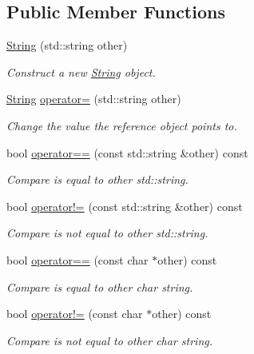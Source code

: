 \subsection*{Public Member Functions}
\begin{DoxyCompactItemize}
\item 
\hyperlink{classtvm_1_1runtime_1_1String_a02fca36e3ff55cc1e83635b02a11fca3}{String} (std\+::string other)
\begin{DoxyCompactList}\small\item\em Construct a new \hyperlink{classtvm_1_1runtime_1_1String}{String} object. \end{DoxyCompactList}\item 
\hyperlink{classtvm_1_1runtime_1_1String}{String} \hyperlink{classtvm_1_1runtime_1_1String_a0d6160f9a7e4efbafa7f6d7a42fec0d4}{operator=} (std\+::string other)
\begin{DoxyCompactList}\small\item\em Change the value the reference object points to. \end{DoxyCompactList}\item 
bool \hyperlink{classtvm_1_1runtime_1_1String_ae0c8008f2660354514aa1f59540ea0a1}{operator==} (const std\+::string \&other) const 
\begin{DoxyCompactList}\small\item\em Compare is equal to other std\+::string. \end{DoxyCompactList}\item 
bool \hyperlink{classtvm_1_1runtime_1_1String_ad6094750f4d337c7e5a1b04180675b41}{operator!=} (const std\+::string \&other) const 
\begin{DoxyCompactList}\small\item\em Compare is not equal to other std\+::string. \end{DoxyCompactList}\item 
bool \hyperlink{classtvm_1_1runtime_1_1String_a21ee70af849336830d9f7d01005dc0a3}{operator==} (const char $\ast$other) const 
\begin{DoxyCompactList}\small\item\em Compare is equal to other char string. \end{DoxyCompactList}\item 
bool \hyperlink{classtvm_1_1runtime_1_1String_afd91d1bddf1d126fbd8f20aebeb020f2}{operator!=} (const char $\ast$other) const 
\begin{DoxyCompactList}\small\item\em Compare is not equal to other char string. \end{DoxyCompactList}\item 

\end{DoxyCompactItemize}

